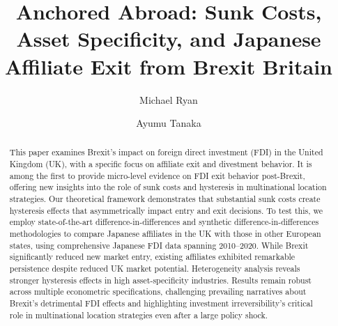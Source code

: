 \documentclass[preprint,11pt,authoryear]{elsarticle}
\begin{document}
\begin{frontmatter}

\title{Anchored Abroad: Sunk Costs, Asset Specificity, and Japanese Affiliate Exit from Brexit Britain}

\author[inst1]{Michael Ryan}

\author[inst2]{Ayumu Tanaka}




\begin{abstract}
This paper examines Brexit's impact on foreign direct investment (FDI) in the United Kingdom (UK), with a specific focus on affiliate exit and divestment behavior.
It is among the first to provide micro-level evidence on FDI exit behavior post-Brexit, offering new insights into the role of sunk costs and hysteresis in multinational location strategies.
Our theoretical framework demonstrates that substantial sunk costs create hysteresis effects that asymmetrically impact entry and exit decisions. 
To test this, we employ state-of-the-art difference-in-differences and synthetic difference-in-differences methodologies to compare Japanese affiliates in the UK with those in other European states, using comprehensive Japanese FDI data spanning 2010--2020.
While Brexit significantly reduced new market entry, existing affiliates exhibited remarkable persistence despite reduced UK market potential. 
Heterogeneity analysis reveals stronger hysteresis effects in high asset-specificity industries. Results remain robust across multiple econometric specifications, challenging prevailing narratives about Brexit's detrimental FDI effects and highlighting investment irreversibility's critical role in multinational location strategies even after a large policy shock.\\
\end{abstract}



\end{frontmatter}
\end{document}
